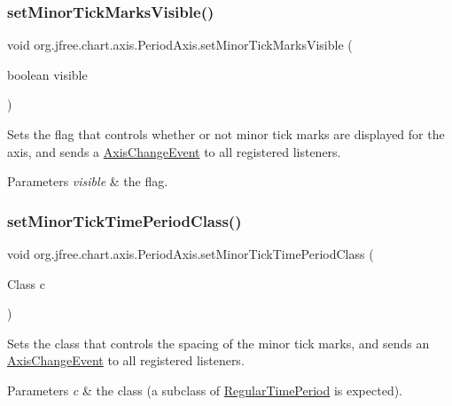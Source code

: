 \subsubsection{\texorpdfstring{set\+Minor\+Tick\+Marks\+Visible()}{setMinorTickMarksVisible()}}
{\footnotesize\ttfamily void org.\+jfree.\+chart.\+axis.\+Period\+Axis.\+set\+Minor\+Tick\+Marks\+Visible (\begin{DoxyParamCaption}\item[{boolean}]{visible }\end{DoxyParamCaption})}

Sets the flag that controls whether or not minor tick marks are displayed for the axis, and sends a \mbox{\hyperlink{}{Axis\+Change\+Event}} to all registered listeners.


\begin{DoxyParams}{Parameters}
{\em visible} & the flag. \\
\hline
\end{DoxyParams}
\mbox{\label{classorg_1_1jfree_1_1chart_1_1axis_1_1_period_axis_a4016fafa1276f624b8d835ef9b6c6433}} 
\subsubsection{\texorpdfstring{set\+Minor\+Tick\+Time\+Period\+Class()}{setMinorTickTimePeriodClass()}}
{\footnotesize\ttfamily void org.\+jfree.\+chart.\+axis.\+Period\+Axis.\+set\+Minor\+Tick\+Time\+Period\+Class (\begin{DoxyParamCaption}\item[{Class}]{c }\end{DoxyParamCaption})}

Sets the class that controls the spacing of the minor tick marks, and sends an \mbox{\hyperlink{}{Axis\+Change\+Event}} to all registered listeners.


\begin{DoxyParams}{Parameters}
{\em c} & the class (a subclass of \mbox{\hyperlink{}{Regular\+Time\+Period}} is expected). \\
\hline
\end{DoxyParams}
\mbox{\label{classorg_1_1jfree_1_1chart_1_1axis_1_1_period_axis_a764a078dbc8532b2d889aa45f6e60903}} 
